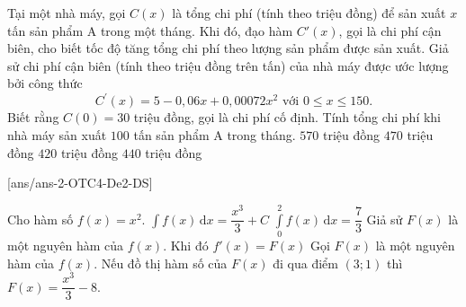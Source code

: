 \begin{ex}%
	Tại một nhà máy, gọi $C(x)$ là tổng chi phí (tính theo triệu đồng) để sản xuất $x$ tấn sản phẩm A trong một tháng. Khi đó, đạo hàm $C'(x)$, gọi là chi phí cận biên, cho biết tốc độ tăng tổng chi phí theo lượng sản phẩm được sản xuất. Giả sử chi phí cận biên (tính theo triệu đồng trên tấn) của nhà máy được ước lượng bởi công thức
	$$
	C^{\prime}(x)=5-0,06 x+0,00072 x^2 \text { với } 0 \leq x \leq 150 .
	$$
	Biết rằng $C(0)=30$ triệu đồng, gọi là chi phí cố định. Tính tổng chi phí khi nhà máy sản xuất $100$ tấn sản phẩm A trong tháng.
	\choice
	{$570$ triệu đồng}
	{\True $470$ triệu đồng}
	{$420$ triệu đồng}
	{$440$ triệu đồng}
\end{ex}
\cauds
{}[ans/ans-2-OTC4-De2-DS]
\begin{ex}%
	Cho hàm số $f(x)=x^2$.
	\choiceTF
	{\True $\displaystyle\int f(x)\mathrm{\,d}x=\dfrac{x^3}{3}+C$}
	{$\displaystyle\int\limits_0^2 f(x)\mathrm{\,d}x=\dfrac{7}{3}$}
	{Giả sử $F(x)$ là một nguyên hàm của $f(x)$. Khi đó $f'(x)=F(x)$}
	{\True Gọi $F(x)$ là một nguyên hàm của $f(x)$. Nếu đồ thị hàm số của $F(x)$ đi qua điểm $(3;1)$ thì $F(x)=\dfrac{x^3}{3}-8$.}
\end{ex}
